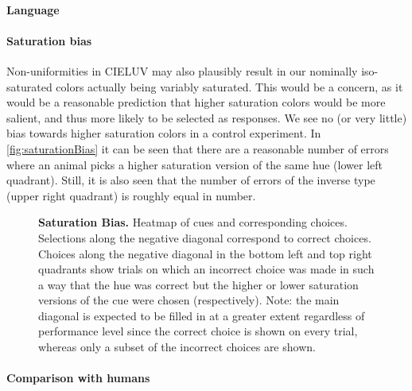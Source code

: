 \paragraph{Language}



\paragraph{Saturation bias}

Non-uniformities in CIELUV may also plausibly result in our nominally iso-saturated colors actually being variably saturated. This would be a concern, as it would be a reasonable prediction that higher saturation colors would be more salient, and thus more likely to be selected as responses. We see no (or very little) bias towards higher saturation colors in a control experiment. In \autoref{fig:saturationBias} it can be seen that there are a reasonable number of errors where an animal picks a higher saturation version of the same hue (lower left quadrant). Still, it is also seen that the number of errors of the inverse type (upper right quadrant) is roughly equal in number.


\begin{figure}

\caption{\textbf{Saturation Bias.}
Heatmap of cues and corresponding choices. Selections along the negative diagonal correspond to correct choices. Choices along the negative diagonal in the bottom left and top right quadrants show trials on which an incorrect choice was made in such a way that the hue was correct but the higher or lower saturation versions of the cue were chosen (respectively). Note: the main diagonal is expected to be filled in at a greater extent regardless of performance level since the correct choice is shown on every trial, whereas only a subset of the incorrect choices are shown.}
\label{fig:saturationBias}
\end{figure}



\paragraph{Comparison with humans} %
